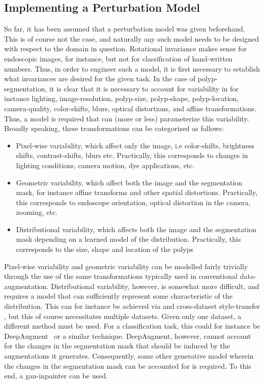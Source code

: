 \subsection{Implementing a Perturbation Model} \label{perturbations}
So far, it has been assumed that a perturbation model was given beforehand. This is of course not the case, and naturally any such model needs to be designed with respect to the domain in question. Rotational invariance makes sense for endoscopic images, for instance, but not for classification of hand-written numbers. Thus, in order to engineer such a model, it is first necessary to establish what invariances are desired for the given task. In the case of polyp-segmentation, it is clear that it is necessary to account for variability in for instance lighting, image-resolution, polyp-size, polyp-shape, polyp-location, camera-quality, color-shifts, blurs, optical distortions, and affine transformations. Thus, a model is required that can (more or less) parameterize this variability. Broadly speaking, these transformations can be categorized as follows:
\begin{itemize}
    \item Pixel-wise variability, which affect only the image, i.e color-shifts, brightness shifts, contrast-shifts,  blurs etc. Practically, this corresponds to changes in lighting conditions, camera motion, dye applications, etc.
    \item Geometric variability, which affect both the image and the segmentation mask, for instance affine transforms and other spatial distortions. Practically, this corresponds to endoscope orientation, optical distortion in the camera, zooming, etc. 
    \item Distributional variability, which affects both the image and the segmentation mask depending on a learned model of the distribution. Practically, this corresponds to the size, shape and location of the polyps
\end{itemize}
Pixel-wise variability and geometric variability can be modelled fairly trivially through the use of the same transformations typically used in conventional data-augmentation. Distributional variability, however, is somewhat more difficult, and requires a model that can sufficiently represent some characteristic of the distribution. This can for instance be achieved via and cross-dataset style-transfer \cite{cyclegan, modelbased} , but this of course necessitates multiple datasets. Given only one dataset, a different method must be used. For a classification task, this could for instance be DeepAugment~\cite{deepaugment} or a similar technique. DeepAugment, however, cannot account for the changes in the segmentation mask that should be induced by the augmentations it generates. Consequently, some other generative model wherein the changes in the segmentation mask can be accounted for is required. To this end, a \gls{gan}-inpainter can be used. 

